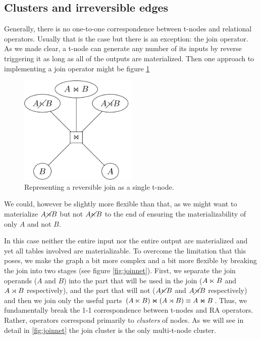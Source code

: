 \subsection{Clusters and irreversible edges}

Generally, there is no one-to-one correspondence between
t-nodes and relational operators. Usually that is the case but
there is an exception: the join operator. As we made clear, a t-node
can generate any number of its inputs by reverse triggering it as
long as all of the outputs are materialized. Then one approach to
implementing a join operator might be figure \ref{fig:join_single_tnode}

\begin{figure}[H]
  \centering
  \includegraphics[width=0.5\textwidth]{./imgs/naivejoinnet.pdf}
  \caption{\label{fig:join_single_tnode}Representing a reversible join as a single t-node.}
\end{figure}

We could, however be slightly more flexible than that, as we
might want to materialize \(A \cancel\rtimes B\) but not \(A \cancel\ltimes B\) to
the end of ensuring the materializability of only \(A\) and not
\(B\).

In this case neither the entire input nor the entire output are
materialized and yet all tables involved are materializable. To
overcome the limitation that this poses, we make the graph a bit more
complex and a bit more flexible by breaking the join into two stages
(see figure \ref{fig:joinnet}). First, we separate the join operands
(\(A\) and \(B\)) into the part that will be used in the join (\(A
\ltimes B\) and \(A \rtimes B\) respectively), and the part that will
not (\(A \cancel\ltimes B\) and \(A \cancel\rtimes B\) respectively) and then we
join only the useful parts \((A \ltimes B) \Join (A \rtimes B) \equiv A
\Join B\). Thus, we fundamentally break the 1-1 correspondence between
t-nodes and RA operators. Rather, operators correspond primarily to
\emph{clusters} of nodes. As we will see in detail in
\ref{fig:joinnet} the join cluster is the only multi-t-node cluster.

